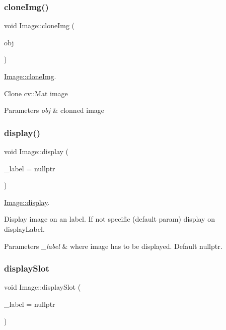 \subsubsection{\texorpdfstring{cloneImg()}{cloneImg()}}
{\footnotesize\ttfamily void Image\+::clone\+Img (\begin{DoxyParamCaption}\item[{cv\+::\+Mat}]{obj }\end{DoxyParamCaption})}



\mbox{\hyperlink{class_image_a5ed60b8ab5bece73fd951c3a23071c04}{Image\+::clone\+Img}}. 

Clone cv\+::\+Mat image 
\begin{DoxyParams}{Parameters}
{\em obj} & clonned image \\
\hline
\end{DoxyParams}
\mbox{\label{class_image_a1ab17bfa8eb3bd96e90febe0ebf6b6f2}} 
\subsubsection{\texorpdfstring{display()}{display()}}
{\footnotesize\ttfamily void Image\+::display (\begin{DoxyParamCaption}\item[{Q\+Label $\ast$}]{\+\_\+label = {\ttfamily nullptr} }\end{DoxyParamCaption})}



\mbox{\hyperlink{class_image_a1ab17bfa8eb3bd96e90febe0ebf6b6f2}{Image\+::display}}. 

Display image on an label. If not specific (default param) display on display\+Label. 
\begin{DoxyParams}{Parameters}
{\em \+\_\+label} & where image has to be displayed. Default nullptr. \\
\hline
\end{DoxyParams}
\mbox{\label{class_image_a0d6d6b06c139bcecada54f98122ccb69}} 
\subsubsection{\texorpdfstring{displaySlot}{displaySlot}}
{\footnotesize\ttfamily void Image\+::display\+Slot (\begin{DoxyParamCaption}\item[{Q\+Label $\ast$}]{\+\_\+label = {\ttfamily nullptr} }\end{DoxyParamCaption})\hspace{0.3cm}{\ttfamily [slot]}}



